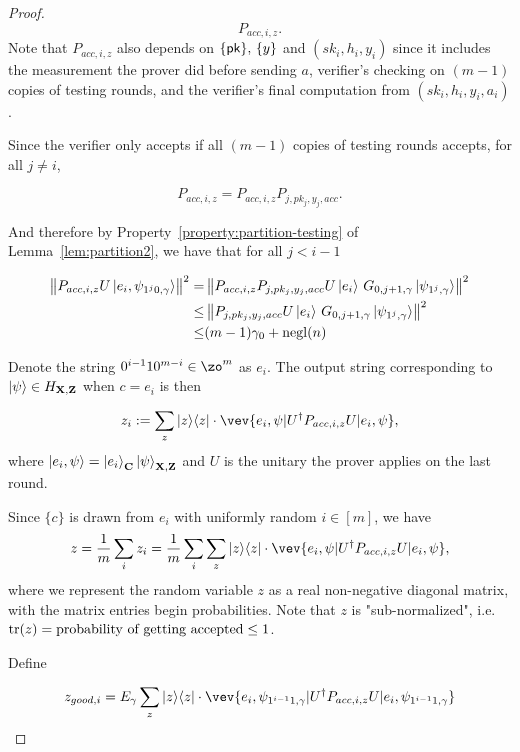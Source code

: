 \begin{proof}
$$P_{acc,i,z}.$$
Note that $P_{acc,i,z}$ also depends on $\{\mathsf{pk}\},\,\{y\}$ and  $(sk_i,h_i,y_i)$ since it includes the measurement the prover did before sending $a$,  verifier's checking on $(m-1)$ copies of testing rounds, and  the verifier's final computation from $(sk_i,h_i,y_i,a_i)$.

Since the verifier only accepts if all $(m-1)$ copies of testing rounds accepts, for all $j\neq i$,

$$P_{acc,i,z}=P_{acc,i,z}P_{j,pk_j,y_j,acc}.$$

And therefore by Property~\ref{property:partition-testing} of Lemma~\ref{lem:partition2}, we have that for all $j <i-1$

\begin{align} \label{eq:rejected-d}
    \left\lVert P_{acc,i,z} U \ket{e_i, \psi_{1^j0,\gamma}}\right\rVert^2
    =& \left\lVert P_{acc,i,z}P_{j,pk_j,y_j,acc} U \ket{e_i}\, G_{0,j+1,\gamma}\ket{\psi_{1^j,\gamma}}  \right\rVert^2 \nonumber \\
    \leq& \left\lVert P_{j,pk_j,y_j,acc} U \ket{e_i}\, G_{0,j+1,\gamma}\ket{\psi_{1^j,\gamma}}  \right\rVert^2 \nonumber \\
    \leq& (m-1)\gamma_0+\operatorname{negl}(n) 
\end{align}


Denote the string $0^{i-1}10^{m-i} \in \zo^m $ as $e_i$. The output string corresponding to $\ket{\psi} \in H_{\mathbf{X},\mathbf{Z}}$ when $c=e_i$ is then 




$$z_i\defeq \sum_z \proj{z} \cdot \vev{e_i,\psi|U^\dag P_{acc,i,z} U|e_i,\psi},$$
where $\ket{e_i,\psi}=\ket{e_i}_{\mathbf{C}}\ket{\psi}_{\mathbf{X},\mathbf{Z}}$ and $U$ is the unitary the prover applies on the last round.

Since $\{c\}$ is drawn  from $e_i$ with uniformly random $i\in [m]$, we have 
$$ z=\frac{1}{m} \sum_i z_i= \frac{1}{m} \sum_i \sum_z \proj{z} \cdot \vev{e_i,\psi|U^\dag P_{acc,i,z} U|e_i,\psi},$$ 
where we represent the random variable $z$ as a real non-negative diagonal matrix, with the matrix entries begin probabilities. Note that $z$ is "sub-normalized", i.e. $\operatorname{tr} (z)= \text{probability of getting accepted} \leq 1$.






Define 

\begin{align}
    z_{good,i}=E_\gamma \sum_z \proj{z} \cdot \vev{e_i,\psi_{1^{i-1}1,\gamma}|U^\dag P_{acc,i,z} U|e_i,\psi_{1^{i-1}1,\gamma}}
\end{align}


\end{proof}
